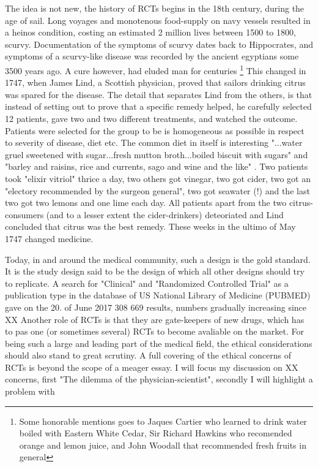 \documentclass[12p]{article}
\begin{document}
The idea is not new, the history of RCTs begins in the 18th century, during the age of sail.
Long voyages and monotenous food-supply on navy vessels resulted in a heinos condition, costing an estimated 2 million lives between 1500 to 1800, scurvy.
Documentation of the symptoms of scurvy dates back to Hippocrates, and symptoms of a scurvy-like disease was recorded by the ancient egyptians some 3500 years ago.
A cure however, had eluded man for centuries \footnote{Some honorable mentions goes to Jaques Cartier who learned to drink water boiled with Eastern White Cedar, Sir Richard Hawkins who recomended orange and lemon juice, and John Woodall that recommended fresh fruits in general}
This changed in 1747, when James Lind, a Scottish physician, proved that sailors drinking citrus was spared for the disease.
The detail that separates Lind from the others, is that instead of setting out to prove that a specific remedy helped, he carefully selected 12 patients, gave two and two different treatments, and watched the outcome.
Patients were selected for the group to be is homogeneous as possible in respect to severity of disease, diet etc.
The common diet in itself is interesting "...water gruel sweetened with sugar...fresh mutton broth...boiled biscuit with sugars" and "barley and raisins, rice and currents, sago and wine and the like" \cite{RN3}.
Two patients took "elixir vitriol" thrice a day, two others got vinegar, two got cider, two got an "electory recommended by the surgeon general", two got seawater (!) and the last two got two lemons and one lime each day.
All patients apart from the two citrus-consumers (and to a lesser extent the cider-drinkers) deteoriated and Lind concluded that citrus was the best remedy.
These weeks in the ultimo of May 1747 changed medicine.

Today, in and around the medical community, such a design is the gold standard.
It is the study design said to be the design of which all other designs should try to replicate. 
A search for "Clinical" and "Randomized Controlled Trial" as a publication type in the database of US National Library of Medicine (PUBMED) gave on the 20. of June 2017 308 669 results, numbers gradually increasing since XX
Another role of RCTs is that they are gate-keepers of new drugs, which has to pas one (or sometimes several) RCTs to become avaliable on the market. 
For being such a large and leading part of the medical field, the ethical considerations should also stand to great scrutiny.
A full covering of the ethical concerns of RCTs is beyond the scope of a meager essay.
I will focus my discussion on XX concerns, first "The dilemma of the physician-scientist", secondly I will highlight a problem with 
\end{document}
